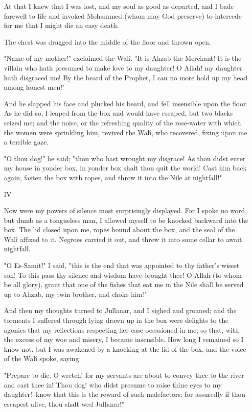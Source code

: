 At that I knew that I was lost, and my soul as good as departed, and
I bade farewell to life and invoked Mohammed (whom may God preserve)
to intercede for me that I might die an easy death.

The chest was dragged into the middle of the floor and thrown open.

"Name of my mother!" exclaimed the Walî. "It is Ahzab the Merchant! It
is the villain who hath presumed to make love to my daughter! O Allah!
my daughter hath disgraced me! By the beard of the Prophet, I can no
more hold up my head among honest men!"

And he slapped his face and plucked his beard, and fell insensible
upon the floor. As he did so, I leaped from the box and would have
escaped, but two blacks seized me; and the noise, or the refreshing
quality of the rose-water with which the women were sprinkling him,
revived the Walî, who recovered, fixing upon me a terrible gaze.

"O thou dog!" he said; "thou who hast wrought my disgrace! As thou
didst enter my house in yonder box, in yonder box shalt thou quit the
world! Cast him back again, fasten the box with ropes, and throw it
into the Nile at nightfall!"


IV

Now were my powers of silence most surprisingly displayed. For I spoke
no word, but dumb as a tongueless man, I allowed myself to be knocked
backward into the box. The lid closed upon me, ropes bound about the
box, and the seal of the Walî affixed to it. Negroes carried it out,
and threw it into some cellar to await nightfall.

"O Es-Samit!" I said, "this is the end that was appointed to thy
father's wisest son! To this pass thy silence and wisdom have brought
thee! O Allah (to whom be all glory), grant that one of the fishes
that eat me in the Nile shall be served up to Ahzab, my twin brother,
and choke him!"

And then my thoughts turned to Jullanar, and I sighed and groaned;
and the torments I suffered through lying drawn up in the box were
delights to the agonies that my reflections respecting her case
occasioned in me; so that, with the excess of my woe and misery,
I became insensible. How long I remained so I know not, but I was
awakened by a knocking at the lid of the box, and the voice of the
Walî spoke, saying:

"Prepare to die, O wretch! for my servants are about to convey thee
to the river and cast thee in! Thou dog! who didst presume to raise
thine eyes to my daughter!--know that this is the reward of such
malefactors; for assuredly if thou escapest alive, thou shalt wed
Jullanar!"

